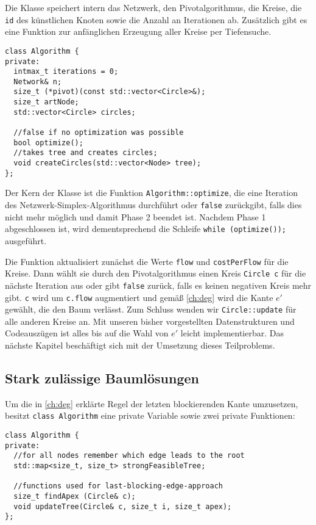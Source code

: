 Die Klasse speichert intern das Netzwerk, den Pivotalgorithmus, die Kreise, die \lstinline|id| des künstlichen Knoten sowie die Anzahl an Iterationen ab. Zusätzlich gibt es eine Funktion zur anfänglichen Erzeugung aller Kreise per Tiefensuche.

\begin{lstlisting}
class Algorithm {
private:
  intmax_t iterations = 0;
  Network& n;
  size_t (*pivot)(const std::vector<Circle>&);
  size_t artNode;
  std::vector<Circle> circles;

  //false if no optimization was possible
  bool optimize();
  //takes tree and creates circles;
  void createCircles(std::vector<Node> tree);
};
\end{lstlisting}

Der Kern der Klasse ist die Funktion \lstinline|Algorithm::optimize|, die eine Iteration des Netzwerk-Simplex-Algorithmus durchführt oder \lstinline|false| zurückgibt, falls dies nicht mehr möglich und damit Phase 2 beendet ist. Nachdem Phase 1 abgeschlossen ist, wird dementsprechend die Schleife \lstinline|while (optimize());| ausgeführt.
 
Die Funktion aktualisiert zunächst die Werte \lstinline|flow| und \lstinline|costPerFlow| für die Kreise. Dann wählt sie durch den Pivotalgorithmus einen Kreis \lstinline|Circle c| für die nächste Iteration aus oder gibt \lstinline|false| zurück, falls es keinen negativen Kreis mehr gibt. \lstinline|c| wird um \lstinline|c.flow| augmentiert und gemäß \cref{ch:deg} wird die Kante $e'$ gewählt, die den Baum verlässt. Zum Schluss wenden wir \lstinline|Circle::update| für alle anderen Kreise an. Mit unseren bisher vorgestellten Datenstrukturen und Codeauszügen ist alles bis auf die Wahl von $e'$ leicht implementierbar. Das nächste Kapitel beschäftigt sich mit der Umsetzung dieses Teilproblems.

\subsection{Stark zulässige Baumlösungen}\label{ch:szBL}
Um die in \cref{ch:deg} erklärte Regel der letzten blockierenden Kante umzusetzen, besitzt \lstinline|class Algorithm| eine private Variable sowie zwei private Funktionen:

\begin{lstlisting}
class Algorithm {
private:
  //for all nodes remember which edge leads to the root
  std::map<size_t, size_t> strongFeasibleTree;
  
  //functions used for last-blocking-edge-approach
  size_t findApex (Circle& c);
  void updateTree(Circle& c, size_t i, size_t apex);
};
\end{lstlisting}

